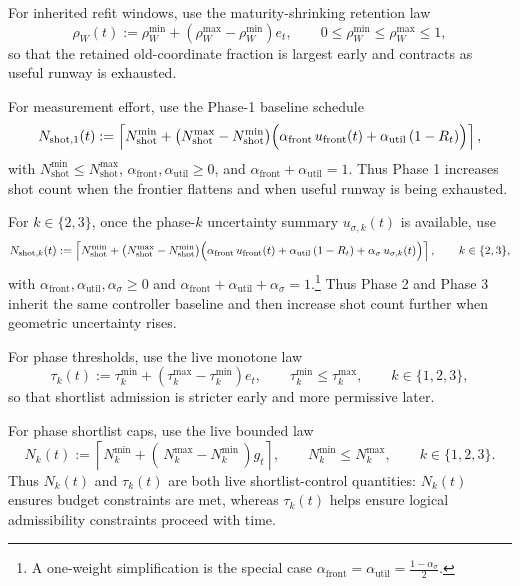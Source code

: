 \documentclass[11pt]{article}
\begin{document}
For inherited refit windows, use the maturity-shrinking retention law
\[
\rho_W(t):=\rho_W^{\min}+(\rho_W^{\max}-\rho_W^{\min})e_t,
\qquad
0\le \rho_W^{\min}\le \rho_W^{\max}\le 1,
\]
so that the retained old-coordinate fraction is largest early and contracts as useful runway is exhausted.

For measurement effort, use the Phase-1 baseline schedule
\[
N_{\mathrm{shot},1}(t):=
\left\lceil
N_{\mathrm{shot}}^{\min}
+
\bigl(N_{\mathrm{shot}}^{\max}-N_{\mathrm{shot}}^{\min}\bigr)
\Bigl(
\alpha_{\mathrm{front}}\,u_{\mathrm{front}}(t)
+
\alpha_{\mathrm{util}}\,(1-R_t)
\Bigr)
\right\rceil,
\]
with \(N_{\mathrm{shot}}^{\min}\le N_{\mathrm{shot}}^{\max}\), \(\alpha_{\mathrm{front}},\alpha_{\mathrm{util}}\ge 0\), and \(\alpha_{\mathrm{front}}+\alpha_{\mathrm{util}}=1\). Thus Phase 1 increases shot count when the frontier flattens and when useful runway is being exhausted.

For \(k\in\{2,3\}\), once the phase-\(k\) uncertainty summary \(u_{\sigma,k}(t)\) is available, use
\[
N_{\mathrm{shot},k}(t):=
\left\lceil
N_{\mathrm{shot}}^{\min}
+
\bigl(N_{\mathrm{shot}}^{\max}-N_{\mathrm{shot}}^{\min}\bigr)
\Bigl(
\alpha_{\mathrm{front}}\,u_{\mathrm{front}}(t)
+
\alpha_{\mathrm{util}}\,(1-R_t)
+
\alpha_{\sigma}\,u_{\sigma,k}(t)
\Bigr)
\right\rceil,
\qquad
k\in\{2,3\},
\]
with \(\alpha_{\mathrm{front}},\alpha_{\mathrm{util}},\alpha_{\sigma}\ge 0\) and \(\alpha_{\mathrm{front}}+\alpha_{\mathrm{util}}+\alpha_{\sigma}=1\).\footnote{A one-weight simplification is the special case \(\alpha_{\mathrm{front}}=\alpha_{\mathrm{util}}=\frac{1-\alpha_{\sigma}}{2}\).} Thus Phase 2 and Phase 3 inherit the same controller baseline and then increase shot count further when geometric uncertainty rises.

For phase thresholds, use the live monotone law
\[
\tau_k(t):=\tau_k^{\min}+(\tau_k^{\max}-\tau_k^{\min})e_t,
\qquad
\tau_k^{\min}\le \tau_k^{\max},
\qquad
k\in\{1,2,3\},
\]
so that shortlist admission is stricter early and more permissive later.

For phase shortlist caps, use the live bounded law
\[
N_k(t):=
\left\lceil
N_k^{\min}+(\,N_k^{\max}-N_k^{\min}\,)g_t
\right\rceil,
\qquad
N_k^{\min}\le N_k^{\max},
\qquad
k\in\{1,2,3\}.
\]
Thus \(N_k(t)\) and \(\tau_k(t)\) are both live shortlist-control quantities: \(N_k(t)\) ensures budget constraints are met, whereas \(\tau_k(t)\) helps ensure logical admissibility constraints proceed with time.
\end{document}
